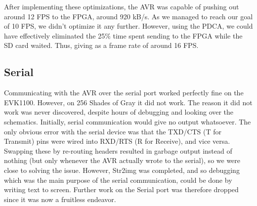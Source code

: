 After implementing these optimizations, the AVR was capable of pushing out around
12 FPS to the \ac{FPGA}, around 920 kB/s. As we managed to reach our goal of 10
FPS, we didn't optimize it any further. However, using the \ac{PDCA}, we could
have effectively eliminated the 25\% time spent sending to the \ac{FPGA} while
the \ac{SD} card waited. Thus, giving as a frame rate of around 16
FPS. 

\subsection{Serial}
\label{sec:avr-serial-issues}
Communicating with the AVR over the serial port worked perfectly fine on the
EVK1100. However, on 256 Shades of Gray it did not work. The reason it did not
work was never discovered, despite hours of debugging and looking over the
schematics. Initially, serial communication would give no output whatsoever. The
only obvious error with the serial device was that the TXD/CTS (T for Transmit)
pins were wired into RXD/RTS (R for Receive), and vice versa. Swapping these by
re-routing headers resulted in garbage output instead of nothing (but only
whenever the AVR actually wrote to the serial), so we were close to solving the
issue. However, Str2img was completed, and so debugging which was the main
purpose of the serial communication, could be done by writing text to
screen. Further work on the Serial port was therefore dropped since it was now a
fruitless endeavor.
